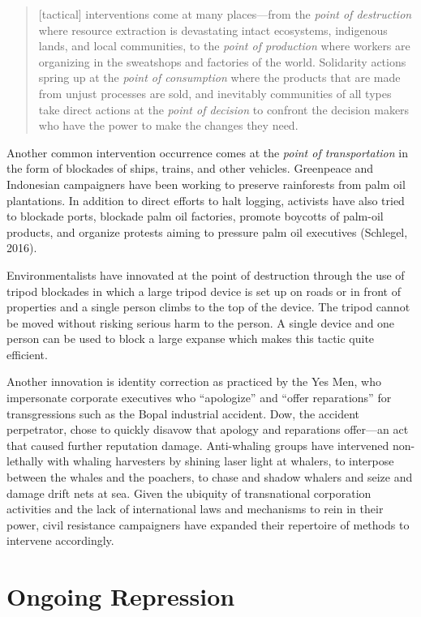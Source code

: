 \documentclass[twoside,a4paper,12pt,fleqn,openany]{extbook}
\begin{document}
\begin{quote}
[tactical] interventions come at many places—from the \emph{point of destruction} where resource extraction is devastating intact ecosystems, indigenous lands, and local communities, to the \emph{point of production} where workers are organizing in the sweatshops and factories of the world. Solidarity actions spring up at the \emph{point of consumption} where the products that are made from unjust processes are sold, and inevitably communities of all types take direct actions at the \emph{point of decision} to confront the decision makers who have the power to make the changes they need.
\end{quote}

Another common intervention occurrence comes at the \emph{point of transportation} in the form of blockades of ships, trains, and other vehicles. Greenpeace and Indonesian campaigners have been working to preserve rainforests from palm oil plantations. In addition to direct efforts to halt logging, activists have also tried to blockade ports, blockade palm oil factories, promote boycotts of palm-oil products, and organize protests aiming to pressure palm oil executives (Schlegel, 2016).

Environmentalists have innovated at the point of destruction through the use of tripod blockades in which a large tripod device is set up on roads or in front of properties and a single person climbs to the top of the device. The tripod cannot be moved without risking serious harm to the person. A single device and one person can be used to block a large expanse which makes this tactic quite efficient.

Another innovation is identity correction as practiced by the Yes Men, who impersonate corporate executives who “apologize” and “offer reparations” for transgressions such as the Bopal industrial accident. Dow, the accident perpetrator, chose to quickly disavow that apology and reparations offer—an act that caused further reputation damage. Anti-whaling groups have intervened non-lethally with whaling harvesters by shining laser light at whalers, to interpose between the whales and the poachers, to chase and shadow whalers and seize and damage drift nets at sea. Given the ubiquity of transnational corporation activities and the lack of international laws and mechanisms to rein in their power, civil resistance campaigners have expanded their repertoire of methods to intervene accordingly.

\section*{Ongoing Repression}
\end{document}
